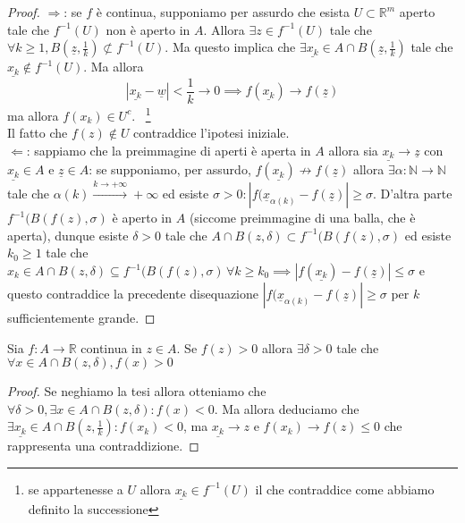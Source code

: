 \documentclass[openany]{book}
\begin{document}
\begin{proof} \hspace{1em} \newline
$\boxed{\Rightarrow}$: se $f$ è continua, supponiamo per assurdo che esista $U \subset \mathbb{R}^m$ aperto tale che $f^{-1}(U)$ non è aperto in $A$. Allora $\exists z \in f^{-1}(U)$ tale che $\forall k \geq 1, B(\underline{z}, \frac{1}{k}) \not\subset f^{-1}(U)$. Ma questo implica che $\exists \underline{x_k} \in A \cap B(\underline{z}, \frac{1}{k})$ tale che $\underline{x_k} \not\in f^{-1}(U)$. Ma allora 
$$
|\underline{x_k} - \underline{w}| < \frac{1}{k} \to 0 \implies f(\underline{x_k}) \to f(\underline{z})
$$
ma allora $f(x_k) \in U^c$. \ \footnote{se appartenesse a $U$ allora $\underline{x_k} \in f^{-1}(U)$ il che contraddice come abbiamo definito la successione} \\ Il fatto che $f(z) \not\in U$ contraddice l'ipotesi iniziale. \\
$\boxed{\Leftarrow}$: sappiamo che la preimmagine di aperti è aperta in $A$ allora sia $\underline{x_k} \to \underline{z}$ con $\underline{x_k} \in A$ e $\underline{z} \in A$: se supponiamo, per assurdo, $f(\underline{x_k}) \not\to f(\underline{z})$ allora $\exists \alpha: \mathbb{N} \to \mathbb{N}$ tale che $\alpha(k) \stackrel{k \to +\infty}{\to} +\infty$ ed esiste $\sigma > 0: |f(\underline{x}_{\alpha(k)} - f(\underline{z})| \geq \sigma$. D'altra parte $f^{-1}(B(f(z), \sigma)$ è aperto in $A$ (siccome preimmagine di una balla, che è aperta), dunque esiste $\delta > 0$ tale che $A \cap B(z, \delta) \subset f^{-1}(B(f(z), \sigma)$ ed esiste $k_0 \geq 1$ tale che $x_k \in A \cap B(z, \delta) \subseteq f^{-1}(B(f(z), \sigma) \, \forall k \geq k_0 \implies |f(\underline{x_k}) - f(\underline{z})| \leq \sigma$ e questo contraddice la precedente disequazione $|f(\underline{x}_{\alpha(k)}-f(\underline{z})| \geq \sigma$ per $k$ sufficientemente grande.
\end{proof}
\begin{theorem}
Sia $f: A \to \mathbb{R}$ continua in $z \in A$. Se $f(z) > 0$ allora $\exists \delta > 0$ tale che $\forall x \in A \cap B(z, \delta), f(x) > 0$
\end{theorem}
\begin{proof}
Se neghiamo la tesi allora otteniamo che $\forall \delta > 0, \exists x \in A \cap B(z, \delta): f(x) < 0$. Ma allora deduciamo che $\exists \underline{x_k} \in A \cap B(z, \frac{1}{k}): f(x_k) <0$, ma $\underline{x_k} \to z$ e $f(x_k) \to f(z) \leq 0$ che rappresenta una contraddizione.
\end{proof}
\end{document}
